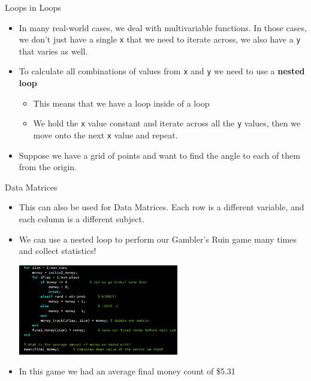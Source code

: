 {}\documentclass[letterpaper,
compress,
xcolor=x11names,
]{beamer}
\begin{document}
\begin{frame}{Loops in Loops}
	\footnotesize
	\begin{itemize}
		\item In many real-world cases, we deal with multivariable functions. In those cases, we don't just have a single \texttt{x} that we need to iterate across, we also have a \texttt{y} that varies as well. 
		\item To calculate all combinations of values from \texttt{x} and \texttt{y} we need to use a \textbf{nested loop}
		\begin{itemize}
			\item This means that we have a loop inside of a loop
			\item We hold the \texttt{x} value constant and iterate across all the \texttt{y} values, then we move onto the next \texttt{x} value and repeat.
		\end{itemize}
		\item<2-> Suppose we have a grid of points and want to find the angle to each of them from the origin.
	\end{itemize}
	\begin{center}
	\end{center}
\end{frame}


\begin{frame}{Data Matrices}
	\footnotesize
	\begin{itemize}
		\item This can also be used for Data Matrices. Each row is a different variable, and each column is a different subject.
		\item We can use a nested loop to perform our Gambler's Ruin game many times and collect statistics!
		\begin{center}
			\includegraphics[width = 7cm]{gamblers_ruin.png}
		\end{center}
		\item In this game we had an average final money count of \$5.31
	\end{itemize}
\end{frame}
\end{document}
